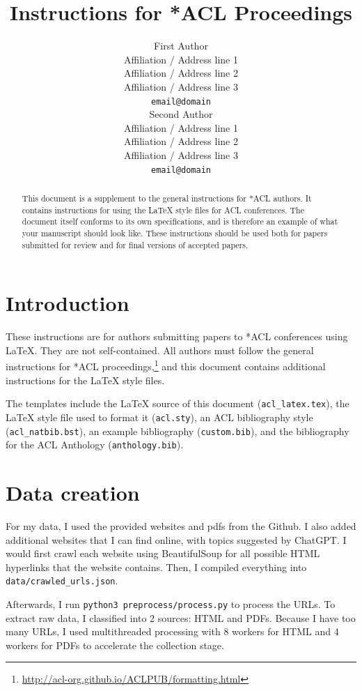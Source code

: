 \documentclass[11pt]{article}
\title{Instructions for *ACL Proceedings}
\author{First Author \\
  Affiliation / Address line 1 \\
  Affiliation / Address line 2 \\
  Affiliation / Address line 3 \\
  \texttt{email@domain} \\\And
  Second Author \\
  Affiliation / Address line 1 \\
  Affiliation / Address line 2 \\
  Affiliation / Address line 3 \\
  \texttt{email@domain} \\}
\begin{document}
\maketitle
\begin{abstract}
This document is a supplement to the general instructions for *ACL authors. It contains instructions for using the \LaTeX{} style files for ACL conferences.
The document itself conforms to its own specifications, and is therefore an example of what your manuscript should look like.
These instructions should be used both for papers submitted for review and for final versions of accepted papers.
\end{abstract}

\section{Introduction}

These instructions are for authors submitting papers to *ACL conferences using \LaTeX. They are not self-contained. All authors must follow the general instructions for *ACL proceedings,\footnote{\url{http://acl-org.github.io/ACLPUB/formatting.html}} and this document contains additional instructions for the \LaTeX{} style files.

The templates include the \LaTeX{} source of this document (\texttt{acl\_latex.tex}),
the \LaTeX{} style file used to format it (\texttt{acl.sty}),
an ACL bibliography style (\texttt{acl\_natbib.bst}),
an example bibliography (\texttt{custom.bib}),
and the bibliography for the ACL Anthology (\texttt{anthology.bib}).

\section{Data creation}


For my data, I used the provided websites and pdfs from the Github. I also added additional websites that I can find online, with topics suggested by ChatGPT. I would first crawl each website using BeautifulSoup for all possible HTML hyperlinks that the website contains. Then, I compiled everything into \texttt{data/crawled\_urls.json}. 

Afterwards, I run \texttt{python3 preprocess/process.py} to process the URLs. To extract raw data, I classified into 2 sources: HTML and PDFs. Because I have too many URLs, I used multithreaded processing with 8 workers for HTML and 4 workers for PDFs to accelerate the collection stage.
\end{document}

